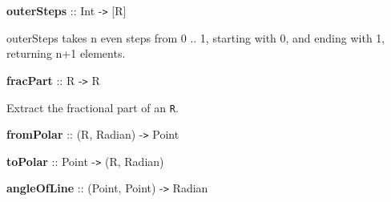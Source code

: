  

{{\bf outerSteps} :: Int -{\tt >} [R]}

\hspace{0.05\textwidth}\begin{minipage}{0.9\textwidth}outerSteps takes n even steps from 0 .. 1, starting with 0, and ending with 1,  returning n+1 elements.
\end{minipage}

 

{{\bf fracPart} :: R -{\tt >} R}

\hspace{0.05\textwidth}\begin{minipage}{0.9\textwidth}Extract the fractional part of an {\tt R}.\end{minipage}

 

{{\bf fromPolar} :: (R, Radian) -{\tt >} Point}

 

{{\bf toPolar} :: Point -{\tt >} (R, Radian)}

 

{{\bf angleOfLine} :: (Point, Point) -{\tt >} Radian}

 

 

